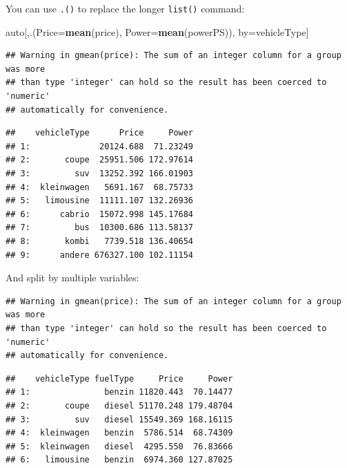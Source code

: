 \documentclass[]{book}
\newenvironment{Shaded}{\begin{snugshade}}{\end{snugshade}}
\newcommand{\KeywordTok}[1]{\textcolor[rgb]{0.13,0.29,0.53}{\textbf{#1}}}
\newcommand{\DataTypeTok}[1]{\textcolor[rgb]{0.13,0.29,0.53}{#1}}
\newcommand{\StringTok}[1]{\textcolor[rgb]{0.31,0.60,0.02}{#1}}
\newcommand{\OperatorTok}[1]{\textcolor[rgb]{0.81,0.36,0.00}{\textbf{#1}}}
\newcommand{\NormalTok}[1]{#1}
\theoremstyle{definition}
\theoremstyle{definition}
\theoremstyle{definition}
\theoremstyle{remark}
\begin{document}
You can use \texttt{.()} to replace the longer \texttt{list()} command:

\begin{Shaded}
\begin{Highlighting}[]
\NormalTok{auto[,.(}\DataTypeTok{Price=}\KeywordTok{mean}\NormalTok{(price), }\DataTypeTok{Power=}\KeywordTok{mean}\NormalTok{(powerPS)), by=vehicleType]}
\end{Highlighting}
\end{Shaded}

\begin{verbatim}
## Warning in gmean(price): The sum of an integer column for a group was more
## than type 'integer' can hold so the result has been coerced to 'numeric'
## automatically for convenience.
\end{verbatim}

\begin{verbatim}
##    vehicleType      Price     Power
## 1:              20124.688  71.23249
## 2:       coupe  25951.506 172.97614
## 3:         suv  13252.392 166.01903
## 4:  kleinwagen   5691.167  68.75733
## 5:   limousine  11111.107 132.26936
## 6:      cabrio  15072.998 145.17684
## 7:         bus  10300.686 113.58137
## 8:       kombi   7739.518 136.40654
## 9:      andere 676327.100 102.11154
\end{verbatim}

And split by multiple variables:

\begin{Shaded}
\end{Shaded}

\begin{verbatim}
## Warning in gmean(price): The sum of an integer column for a group was more
## than type 'integer' can hold so the result has been coerced to 'numeric'
## automatically for convenience.
\end{verbatim}

\begin{verbatim}
##    vehicleType fuelType     Price     Power
## 1:               benzin 11820.443  70.14477
## 2:       coupe   diesel 51170.248 179.48704
## 3:         suv   diesel 15549.369 168.16115
## 4:  kleinwagen   benzin  5786.514  68.74309
## 5:  kleinwagen   diesel  4295.550  76.83666
## 6:   limousine   benzin  6974.360 127.87025
\end{verbatim}
\end{document}

